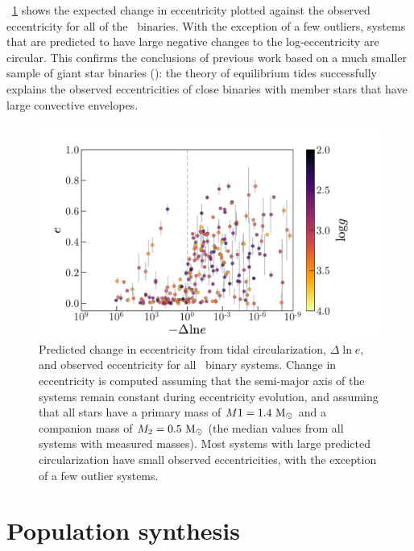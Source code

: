 \documentclass[modern, letterpaper]{aastex62}
\newcommand{\apogee}{\project{\acronym{APOGEE}}}
\begin{document}
\figurename~\ref{fig:dlne} shows the expected change in eccentricity plotted
against the observed eccentricity for all of the \apogee\ binaries.
With the exception of a few outliers, systems that are predicted to have large
negative changes to the log-eccentricity are circular.
This confirms the conclusions of previous work based on a much smaller sample of
giant star binaries (\citealt{Verbunt:1995}): the theory of equilibrium tides
successfully explains the observed eccentricities of close binaries with
member stars that have large convective envelopes.

\begin{figure}[h]
\begin{center}
\includegraphics[width=\textwidth]{dlne}
\end{center}
\caption{%
Predicted change in eccentricity from tidal circularization, $\Delta \ln e$, and
observed eccentricity for all \apogee\ binary systems.
Change in eccentricity is computed assuming that the semi-major axis of the
systems remain constant during eccentricity evolution, and assuming that all
stars have a primary mass of $M1 = 1.4~\mathrm{M}_\odot$ and a companion mass of $M_2 =
0.5~\mathrm{M}_\odot$ (the median values from all systems with measured masses).
Most systems with large predicted circularization have small observed
eccentricities, with the exception of a few outlier systems.
\label{fig:dlne}
}
\end{figure}


\section{Population synthesis}
\label{sec:theory}

\end{document}
